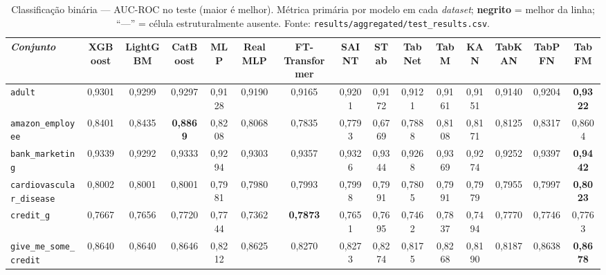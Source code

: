 

\begin{landscape}

\setlength{\floatsep}{10pt plus 2pt}

\begin{table}[htbp]
\centering
\scriptsize
\setlength{\tabcolsep}{3pt}
\caption[Classificação binária --- resultados completos]{Classificação binária --- AUC-ROC no teste (maior é melhor). Métrica primária por modelo em cada \emph{dataset}; \textbf{negrito} = melhor da linha; ``---'' = célula estruturalmente ausente. Fonte: \texttt{results/\allowbreak aggregated/\allowbreak test\_\allowbreak results.\allowbreak csv}.}
\label{tab:app-binaria}
\begin{tabular}{lcccccccccccccc}
\toprule
\emph{Conjunto} & XGBoost & LightGBM & CatBoost & MLP & RealMLP & FT-Transformer & SAINT & STab & TabNet & TabM & KAN & TabKAN & TabPFN & TabFM \\
\midrule
\texttt{adult} & 0{,}9301 & 0{,}9299 & 0{,}9297 & 0{,}9128 & 0{,}9190 & 0{,}9165 & 0{,}9201 & 0{,}9172 & 0{,}9121 & 0{,}9161 & 0{,}9151 & 0{,}9140 & 0{,}9204 & \textbf{0{,}9322} \\
\texttt{amazon\_\allowbreak employee} & 0{,}8401 & 0{,}8435 & \textbf{0{,}8869} & 0{,}8208 & 0{,}8068 & 0{,}7835 & 0{,}7793 & 0{,}6769 & 0{,}7888 & 0{,}8108 & 0{,}8171 & 0{,}8125 & 0{,}8317 & 0{,}8604 \\
\texttt{bank\_\allowbreak marketing} & 0{,}9339 & 0{,}9292 & 0{,}9333 & 0{,}9294 & 0{,}9303 & 0{,}9357 & 0{,}9326 & 0{,}9344 & 0{,}9268 & 0{,}9369 & 0{,}9274 & 0{,}9252 & 0{,}9397 & \textbf{0{,}9442} \\
\texttt{cardiovascular\_\allowbreak disease} & 0{,}8002 & 0{,}8001 & 0{,}8001 & 0{,}7981 & 0{,}7980 & 0{,}7993 & 0{,}7998 & 0{,}7991 & 0{,}7805 & 0{,}7991 & 0{,}7979 & 0{,}7955 & 0{,}7997 & \textbf{0{,}8023} \\
\texttt{credit\_g} & 0{,}7667 & 0{,}7656 & 0{,}7720 & 0{,}7744 & 0{,}7362 & \textbf{0{,}7873} & 0{,}7651 & 0{,}7695 & 0{,}7462 & 0{,}7837 & 0{,}7494 & 0{,}7770 & 0{,}7746 & 0{,}7763 \\
\texttt{give\_\allowbreak me\_\allowbreak some\_\allowbreak credit} & 0{,}8640 & 0{,}8640 & 0{,}8646 & 0{,}8212 & 0{,}8625 & 0{,}8270 & 0{,}8273 & 0{,}8274 & 0{,}8175 & 0{,}8268 & 0{,}8190 & 0{,}8187 & 0{,}8638 & \textbf{0{,}8678} \\

\end{tabular}
\end{table}
\end{landscape}
